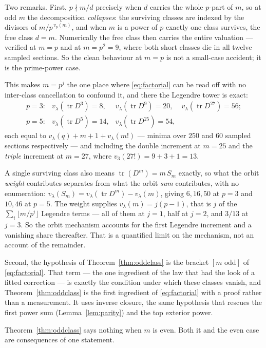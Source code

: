 \documentclass[11pt]{article}
\theoremstyle{plain}
\theoremstyle{definition}
\newcommand{\tr}{\operatorname{tr}}
\newcommand{\vlam}{v_\lambda}
\begin{document}
Two remarks. First, $p\nmid m/d$ precisely when $d$ carries the whole $p$-part
of $m$, so at odd $m$ the decomposition \emph{collapses}: the surviving classes
are indexed by the divisors of $m/p^{\,v_p(m)}$, and when $m$ is a power of $p$
exactly one class survives, the free class $d=m$. Numerically the free class
then carries the entire valuation --- verified at $m=p$ and at $m=p^{2}=9$,
where both short classes die in all twelve sampled sections. So the clean
behaviour at $m=p$ is not a small-case accident; it is the prime-power case.

This makes $m=p^{j}$ the one place where \eqref{eq:factorial} can be read off
with no inter-class cancellation to confound it, and there the Legendre tower
is exact:
\[
\begin{array}{llll}
p=3: & \vlam(\tr D^{3})=8, & \vlam(\tr D^{9})=20, & \vlam(\tr D^{27})=56;\\
p=5: & \vlam(\tr D^{5})=14, & \vlam(\tr D^{25})=54, &
\end{array}
\]
each equal to $\vlam(q)+m+1+\vlam(m!)$ --- minima over $250$ and $60$ sampled
sections respectively --- and including the double increment at $m=25$ and the
\emph{triple} increment at $m=27$, where $v_3(27!)=9+3+1=13$.

A single surviving class also means $\tr(D^m)=m\,S_m$ exactly, so what the
orbit \emph{weight} contributes separates from what the orbit \emph{sum}
contributes, with no enumeration: $\vlam(S_m)=\vlam(\tr D^m)-\vlam(m)$, giving
$6,16,50$ at $p=3$ and $10,46$ at $p=5$. The weight supplies $\vlam(m)=j(p-1)$,
that is $j$ of the $\sum_i\lfloor m/p^i\rfloor$ Legendre terms --- all of them
at $j=1$, half at $j=2$, and $3/13$ at $j=3$. So the orbit mechanism accounts
for the first Legendre increment and a vanishing share thereafter. That is a
quantified limit on the mechanism, not an account of the remainder.

Second, the hypothesis of Theorem~\ref{thm:oddclass} is the bracket
$[m\text{ odd}]$ of \eqref{eq:factorial}. That term --- the one ingredient of
the law that had the look of a fitted correction --- is exactly the condition
under which these classes vanish, and Theorem~\ref{thm:oddclass} is the first
ingredient of \eqref{eq:factorial} with a proof rather than a measurement. It
uses inverse closure, the same hypothesis that rescues the first power sum
(Lemma~\ref{lem:parity}) and the top exterior power.

Theorem~\ref{thm:oddclass} says nothing when $m$ is even. Both it and the even
case are consequences of one statement.
\end{document}
